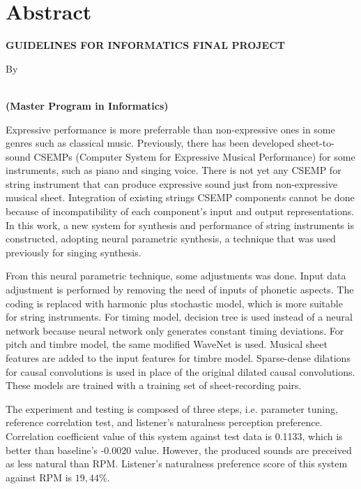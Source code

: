 \clearpage
\chapter*{Abstract}
\begin{center}
	\singlespacing
    \large \bfseries \MakeUppercase{Guidelines for Informatics Final Project} %

    \normalsize \normalfont By

    \bfseries \large \theauthor\\
    \normalsize (Master Program in Informatics)
    \bigskip
\end{center}

\begin{singlespace}

Expressive performance is more preferrable than non-expressive ones in some genres such as classical music. Previously, there has been developed sheet-to-sound CSEMPs (Computer System for Expressive Musical Performance) for some instruments, such as piano and singing voice. There is not yet any CSEMP for string instrument that can produce expressive sound just from non-expressive musical sheet. Integration of existing strings CSEMP components cannot be done because of incompatibility of each component's input and output representations. In this work, a new system for synthesis and performance of string instruments is constructed, adopting neural parametric synthesis, a technique that was used previously for singing synthesis.

From this neural parametric technique, some adjustments was done. Input data adjustment is performed by removing the need of inputs of phonetic aspects. The coding is replaced with harmonic plus stochastic model, which is more suitable for string instruments. For timing model, decision tree is used instead of a neural network because neural network only generates constant timing deviations. For pitch and timbre model, the same modified WaveNet is used. Musical sheet features are added to the input features for timbre model. Sparse-dense dilations for causal convolutions is used in place of the original dilated causal convolutions. These models are trained with a training set of sheet-recording pairs.

The experiment and testing is composed of three steps, i.e. parameter tuning, reference correlation test, and listener's naturalness perception preference. Correlation coefficient value of this system against test data is 0.1133, which is better than baseline's -0.0020 value. However, the produced sounds are preceived as less natural than RPM. Listener's naturalness preference score of this system against RPM is $19,44\%$.

\end{singlespace}
\clearpage